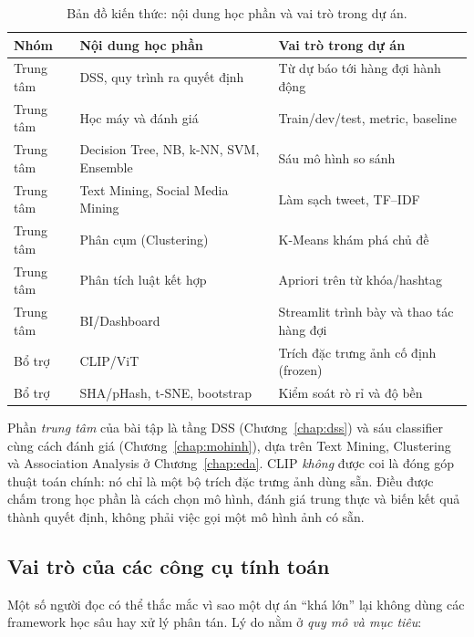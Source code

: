 \begin{table}[H]
\centering
\small
\caption{Bản đồ kiến thức: nội dung học phần và vai trò trong dự án.}
\label{tab:concept-map}
\begin{tabularx}{\textwidth}{p{2.4cm}p{5.2cm}X}
\toprule
\textbf{Nhóm} & \textbf{Nội dung học phần} & \textbf{Vai trò trong dự án}\\
\midrule
Trung tâm & DSS, quy trình ra quyết định & Từ dự báo tới hàng đợi hành động\\
Trung tâm & Học máy và đánh giá & Train/dev/test, metric, baseline\\
Trung tâm & Decision Tree, NB, k-NN, SVM, Ensemble & Sáu mô hình so sánh\\
Trung tâm & Text Mining, Social Media Mining & Làm sạch tweet, TF--IDF\\
Trung tâm & Phân cụm (Clustering) & K-Means khám phá chủ đề\\
Trung tâm & Phân tích luật kết hợp & Apriori trên từ khóa/hashtag\\
Trung tâm & BI/Dashboard & Streamlit trình bày và thao tác hàng đợi\\
\midrule
Bổ trợ & CLIP/ViT & Trích đặc trưng ảnh cố định (frozen)\\
Bổ trợ & SHA/pHash, t-SNE, bootstrap & Kiểm soát rò rỉ và độ bền\\
\bottomrule
\end{tabularx}
\end{table}

\begin{insight}
Phần \emph{trung tâm} của bài tập là tầng DSS (Chương~\ref{chap:dss}) và sáu
classifier cùng cách đánh giá (Chương~\ref{chap:mohinh}), dựa trên Text Mining,
Clustering và Association Analysis ở Chương~\ref{chap:eda}. CLIP \emph{không}
được coi là đóng góp thuật toán chính: nó chỉ là một bộ trích đặc trưng ảnh dùng
sẵn. Điều được chấm trong học phần là cách chọn mô hình, đánh giá trung thực và
biến kết quả thành quyết định, không phải việc gọi một mô hình ảnh có sẵn.
\end{insight}

\subsection{Vai trò của các công cụ tính toán}

Một số người đọc có thể thắc mắc vì sao một dự án ``khá lớn'' lại không dùng các
framework học sâu hay xử lý phân tán. Lý do nằm ở \emph{quy mô và mục tiêu}:

